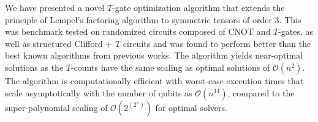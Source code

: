 \documentclass[a0,landscape]{a0poster}
\begin{document}
\begin{multicols}{3}
\begin{minipage}[b]{0.95\linewidth}
		\begin{tcolorbox}[ title=\textcolor{white}{\huge\textbf{\textsf{Summary and Conclusions}\textcolor{black}{y}}}]

			We have presented a novel $T$-gate optimization algorithm that extends the principle of Lempel's factoring algorithm to symmetric tensors of order 3. This was benchmark tested on randomized  circuits composed of $\mathrm{CNOT}$ and $T$-gates, as well as structured Clifford + $T$ circuits and was found to perform better than the best known algorithms from previous works. The algorithm yields near-optimal solutions as the $T$-counts have the same scaling as optimal solutions of $\mathcal{O}(n^2)$. The algorithm is computationally efficient with worst-case execution times that scale asymptotically with the number of qubits as $\mathcal{O}(n^{14})$, compared to the super-polynomial scaling of $\mathcal{O}(2^{(2^n)})$ for optimal solvers. %
		\end{tcolorbox}
		\begin{tcolorbox}[title=\textcolor{white}{\huge\textbf{\textsf{References\textcolor{black}{y}}}}]
			\renewcommand\refname{\vskip -2cm}
			
			
		\end{tcolorbox}
	\end{minipage}	
\end{multicols}

\end{document}
